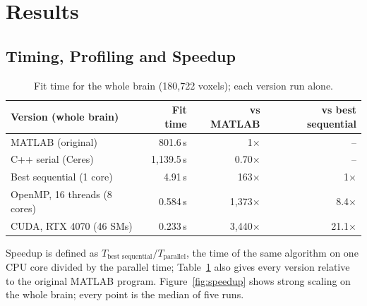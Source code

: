 \documentclass[11pt]{article}
\begin{document}
\section{Results}

\subsection{Timing, Profiling and Speedup}

\begin{table}[htbp]
\centering
\begin{tabular}{lrrr}
\toprule
Version (whole brain) & Fit time & vs MATLAB & vs best sequential \\
\midrule
MATLAB (original) & 801.6\,s & 1$\times$ & -- \\
C++ serial (Ceres) & 1,139.5\,s & 0.70$\times$ & -- \\
Best sequential (1 core) & 4.91\,s & 163$\times$ & 1$\times$ \\
OpenMP, 16 threads (8 cores) & 0.584\,s & 1,373$\times$ & 8.4$\times$ \\
CUDA, RTX 4070 (46 SMs) & 0.233\,s & 3,440$\times$ & 21.1$\times$ \\
\bottomrule
\end{tabular}
\caption{Fit time for the whole brain (180,722 voxels); each version run alone.}
\label{tab:results}
\end{table}

Speedup is defined as $T_{\text{best sequential}} / T_{\text{parallel}}$, the time of the same
algorithm on one CPU core divided by the parallel time; Table~\ref{tab:results} also gives every
version relative to the original MATLAB program. Figure~\ref{fig:speedup} shows strong scaling on
the whole brain; every point is the median of five runs.
\end{document}
